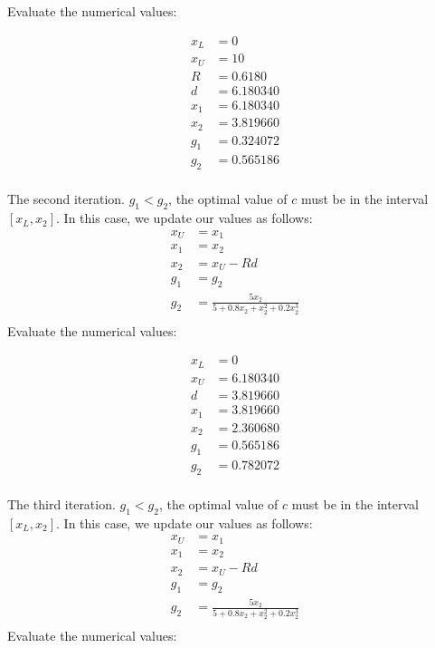 \documentclass[12pt, a4paper]{article}
\numberwithin{equation}{section}
\begin{document}
Evaluate the numerical values:

\begin{equation}
\begin{align}
x_L &= 0 \\
x_U &= 10 \\
R &= 0.6180\\
d &= 6.180340\\
x_1 &= 6.180340\\
x_2 &= 3.819660\\
g_1 &= 0.324072\\
g_2 &= 0.565186 \\
\end{align}
\end{equation}

The second iteration. $g_1 < g_2$, the optimal value of $c$ must be in the interval $[x_L, x_2]$. In this case, we update our values as follows:
\begin{equation}
\begin{align}
x_U &= x_1\\
x_1 &= x_2\\
x_2 &= x_U - Rd\\
g_1 &= g_2\\
g_2 &= \frac{5x_2}{5 + 0.8x_2 + x_2^2 + 0.2x_2^3}\\
\end{align}
\end{equation}
Evaluate the numerical values:

\begin{equation}
\begin{align}
x_L &= 0 \\
x_U &= 6.180340 \\
d &= 3.819660\\
x_1 &= 3.819660\\
x_2 &= 2.360680\\
g_1 &= 0.565186\\
g_2 &= 0.782072 \\
\end{align}
\end{equation}

The third iteration. $g_1 < g_2$, the optimal value of $c$ must be in the interval $[x_L, x_2]$. In this case, we update our values as follows:
\begin{equation}
\begin{align}
x_U &= x_1\\
x_1 &= x_2\\
x_2 &= x_U - Rd\\
g_1 &= g_2\\
g_2 &= \frac{5x_2}{5 + 0.8x_2 + x_2^2 + 0.2x_2^3}\\
\end{align}
\end{equation}
Evaluate the numerical values:
\end{document}
